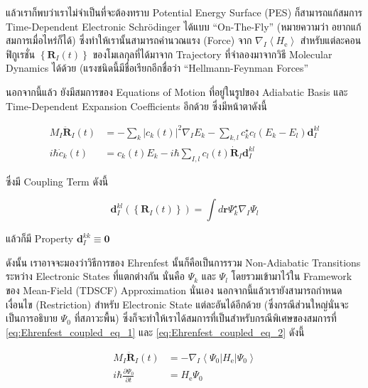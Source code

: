 \noindent แล้วเราก็พบว่าเราไม่จำเป็นที่จะต้องทราบ Potential Energy Surface (PES) ก็สามารถแก้สมการ Time-Dependent Electronic
Schr\"{o}dinger ได้แบบ \enquote{On-The-Fly} (หมายความว่า อยากแก้สมการเมื่อไหร่ก็ได้) ซึ่งทำให้เรานั้นสามารถคำนวณแรง (Force)
จาก $\nabla_I\left\langle H_{\mathrm{e}}\right\rangle$ สำหรับแต่ละคอนฟิกูเรชั่น $\left\{\mathbf{R}_I(t)\right\}$
ของโมเลกุลที่ได้มาจาก Trajectory ที่จำลองมาจากวิธี Molecular Dynamics ได้ด้วย (แรงชนิดนี้มีชื่อเรียกอีกชื่อว่า \enquote{Hellmann-Feynman
  Forces}

นอกจากนี้แล้ว ยังมีสมการของ Equations of Motion ที่อยู่ในรูปของ Adiabatic Basis และ Time-Dependent Expansion Coefficients
อีกด้วย ซึ่งมีหน้าตาดังนี้

\begin{align}
  M_I \ddot{\mathbf{R}}_I(t) &
  =
  -\sum_k\left|c_k(t)\right|^2 \nabla_I E_k-\sum_{k, l} c_k^{\star} c_l\left(E_k-E_l\right) \mathbf{d}_I^{k l} \\
  i \hbar \dot{c}_k(t)
                             & = c_k(t) E_k-i \hbar \sum_{I, l} c_l(t) \dot{\mathbf{R}}_I \mathbf{d}_I^{k l}
\end{align}

\noindent ซึ่งมี Coupling Term ดังนี้

\begin{equation}
  \mathbf{d}_I^{k l}\left(\left\{\mathbf{R}_I(t)\right\}\right)
  =
  \int d \mathbf{r} \Psi_k^{\star} \nabla_I \Psi_l
\end{equation}

\noindent แล้วก็มี Property $\mathbf{d}_I^{k k} \equiv \mathbf{0}$

ดังนั้น เราอาจจะมองว่าวิธีการของ Ehrenfest นั้นก็คือเป็นการรวม Non-Adiabatic Transitions ระหว่าง Electronic States ที่แตกต่างกัน
นั่นคือ $\Psi_k$ และ $\Psi_l$ โดยรวมเข้ามาไว้ใน Framework ของ Mean-Field (TDSCF) Approximation นั่นเอง
นอกจากนี้แล้วเรายังสามารถกำหนดเงื่อนไข (Restriction) สำหรับ Electronic State แต่ละอันได้อีกด้วย (ซึ่งกรณีส่วนใหญ่นั่นจะเป็นการอธิบาย
$\Psi_0$ ที่สภาวะพื้น) ซึ่งก็จะทำให้เราได้สมการที่เป็นสำหรับกรณีพิเศษของสมการที่ \eqref{eq:Ehrenfest_coupled_eq_1} และ
\eqref{eq:Ehrenfest_coupled_eq_2} ดังนี้

\begin{align}
  M_I \ddot{\mathbf{R}}_I(t)
   & =
  -\nabla_I\left\langle\Psi_0\left|H_{\mathrm{e}}\right| \Psi_0\right\rangle \\
  i \hbar \frac{\partial \Psi_0}{\partial t}
   & = H_{\mathrm{e}} \Psi_0
\end{align}

